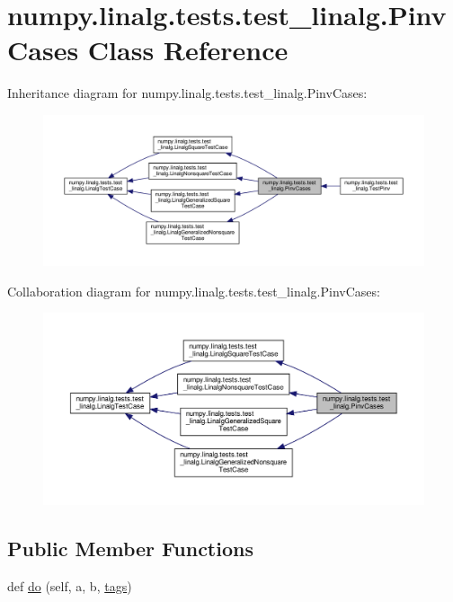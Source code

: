 \hypertarget{classnumpy_1_1linalg_1_1tests_1_1test__linalg_1_1PinvCases}{}\section{numpy.\+linalg.\+tests.\+test\+\_\+linalg.\+Pinv\+Cases Class Reference}
\label{classnumpy_1_1linalg_1_1tests_1_1test__linalg_1_1PinvCases}


Inheritance diagram for numpy.\+linalg.\+tests.\+test\+\_\+linalg.\+Pinv\+Cases\+:
\nopagebreak
\begin{figure}[H]
\begin{center}
\leavevmode
\includegraphics[width=350pt]{classnumpy_1_1linalg_1_1tests_1_1test__linalg_1_1PinvCases__inherit__graph}
\end{center}
\end{figure}


Collaboration diagram for numpy.\+linalg.\+tests.\+test\+\_\+linalg.\+Pinv\+Cases\+:
\nopagebreak
\begin{figure}[H]
\begin{center}
\leavevmode
\includegraphics[width=350pt]{classnumpy_1_1linalg_1_1tests_1_1test__linalg_1_1PinvCases__coll__graph}
\end{center}
\end{figure}
\subsection*{Public Member Functions}
\begin{DoxyCompactItemize}
\item 
def \hyperlink{classnumpy_1_1linalg_1_1tests_1_1test__linalg_1_1PinvCases_a89344c40e5edd15282b994b451ccf34e}{do} (self, a, b, \hyperlink{namespacenumpy_1_1linalg_1_1tests_1_1test__linalg_ac6a064918e74d701a7b5aac0ffefe1e7}{tags})
\end{DoxyCompactItemize}
